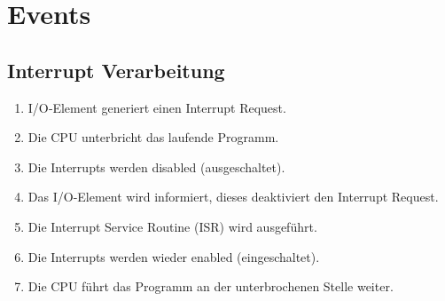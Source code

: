 \section{Events}
\subsection{Interrupt Verarbeitung}
\begin{enumerate}
	\item I/O‐Element generiert einen Interrupt Request.
	\item Die CPU unterbricht das laufende Programm.
	\item Die Interrupts werden disabled (ausgeschaltet).
	\item Das I/O‐Element wird informiert, dieses deaktiviert den Interrupt Request.
	\item Die Interrupt Service Routine (ISR) wird ausgeführt.
	\item Die Interrupts werden wieder enabled (eingeschaltet).
	\item Die CPU führt das Programm an der unterbrochenen Stelle weiter.
\end{enumerate}

